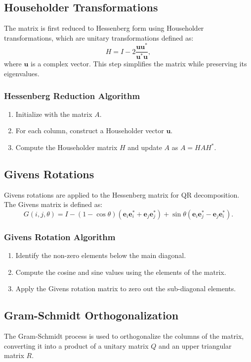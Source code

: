 \documentclass[12pt]{article}
\begin{document}
\subsection{Householder Transformations}
The matrix is first reduced to Hessenberg form using Householder transformations, which are unitary transformations defined as:
\[
H = I - 2\frac{\mathbf{u}\mathbf{u}^*}{\mathbf{u}^*\mathbf{u}},
\]
where $\mathbf{u}$ is a complex vector. This step simplifies the matrix while preserving its eigenvalues.

\subsubsection{Hessenberg Reduction Algorithm}
\begin{enumerate}
    \item Initialize with the matrix $A$.
    \item For each column, construct a Householder vector $\mathbf{u}$.
    \item Compute the Householder matrix $H$ and update $A$ as $A = HAH^*$.
\end{enumerate}

\subsection{Givens Rotations}
Givens rotations are applied to the Hessenberg matrix for QR decomposition. The Givens matrix is defined as:
\[
G(i, j, \theta) = I - (1 - \cos\theta)(\mathbf{e}_i \mathbf{e}_i^* + \mathbf{e}_j \mathbf{e}_j^*) + \sin\theta(\mathbf{e}_i \mathbf{e}_j^* - \mathbf{e}_j \mathbf{e}_i^*).
\]

\subsubsection{Givens Rotation Algorithm}
\begin{enumerate}
    \item Identify the non-zero elements below the main diagonal.
    \item Compute the cosine and sine values using the elements of the matrix.
    \item Apply the Givens rotation matrix to zero out the sub-diagonal elements.
\end{enumerate}

\subsection{Gram-Schmidt Orthogonalization}
The Gram-Schmidt process is used to orthogonalize the columns of the matrix, converting it into a product of a unitary matrix $Q$ and an upper triangular matrix $R$.
\end{document}
